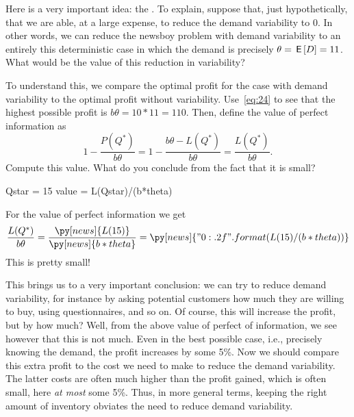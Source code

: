 \begin{exercise}
Here is a very important idea: the . To explain,  suppose that, just hypothetically, that  we are able, at a large expense, to reduce the demand variability to 0. In other words, we can reduce the newsboy problem with demand variability to an entirely this deterministic case in which the demand is precisely $\theta = \,\mathsf{E}\left[D\right] = 11$. What would be the value of this reduction in variability? 

To understand this, we compare the optimal profit for the case with demand variability to the optimal profit without variability.  Use~\eqref{eq:24} to see that the highest possible profit is $b \theta = 10*11 = 110$. Then, define the value of perfect information as
\begin{equation*}
1-  \frac{P(Q^*)}{b \theta} = 
1-  \frac{b \theta - L(Q^*)}{b \theta} = 
 \frac{L(Q^*)}{b \theta}.
\end{equation*}
Compute this value. What do you conclude from the fact that it is small?
\begin{solution}
\begin{pycode}[news]
Qstar = 15
value = L(Qstar)/(b*theta)
\end{pycode}
For the value of perfect information we get
\begin{equation*}
 \frac{L(Q^*)}{b \theta} = \frac{\py[news]{L(15)}}{\py[news]{b*theta}} = 
\py[news]{"{0:.2f}".format(L(15)/(b*theta))}
\end{equation*}
This is pretty small! 

This brings us to a very important conclusion: we can try to reduce  demand variability, for instance  by asking potential customers how much they are willing to buy, using questionnaires, and so on. Of course, this will increase the profit, but by how much? Well, from the above value of perfect of information, we see however that this is not much. Even in the best possible case, i.e., precisely knowing the demand, the profit increases by some 5\%. Now we should compare this extra profit to the cost we need to make to reduce the demand variability. The latter costs are often much higher than the profit gained, which is often small, here \emph{at most} some 5\%. Thus, in more general terms, keeping the right amount of inventory obviates the need to reduce demand variability.
\end{solution}
\end{exercise}


